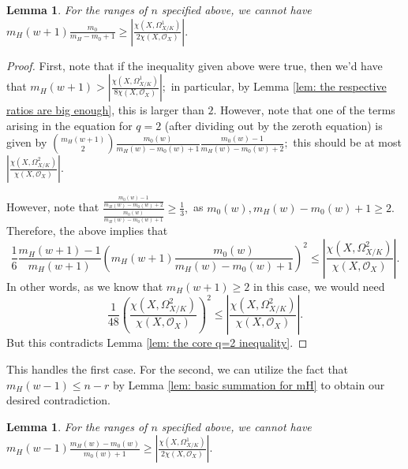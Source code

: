 \documentclass{article}
\newtheorem{lemma}[thm]{Lemma}
\theoremstyle{definition}
\theoremstyle{remark}
\begin{document}
\begin{lemma}
For the ranges of $n$ specified above, we cannot have $m_H(w+1) \frac{m_0}{m_H - m_0 + 1} \geq \left|\frac{\chi(X, \Omega^1_{X/K})}{2\chi(X, \mathcal{O}_X)}\right|.$
\end{lemma}
\begin{proof}
First, note that if the inequality given above were true, then we'd have that $m_H(w+1) > \left|\frac{\chi(X, \Omega^1_{X/K})}{8 \chi(X, \mathcal{O}_X)}\right|;$ in particular, by Lemma \ref{lem: the respective ratios are big enough}, this is larger than $2.$ However, note that one of the terms arising in the equation for $q = 2$ (after dividing out by the zeroth equation) is given by $\binom{m_H(w+1)}{2} \frac{m_0(w)}{m_H(w) - m_0(w) + 1} \frac{m_0(w) - 1}{m_H(w) - m_0(w) + 2};$ this should be at most $\left|\frac{\chi(X, \Omega^2_{X/K})}{\chi(X, \mathcal{O}_X)}\right|.$
\par However, note that $\frac{\frac{m_0(w) - 1}{m_H(w) - m_0(w) + 2}}{\frac{m_0(w)}{m_H(w) - m_0(w) + 1}} \geq \frac{1}{3},$ as $m_0(w), m_H(w) - m_0(w) + 1 \geq 2.$ Therefore, the above implies that $$\frac{1}{6}\frac{m_H(w+1) - 1}{m_H(w+1)} \left(m_H(w+1) \frac{m_0(w)}{m_H(w) - m_0(w) + 1}\right)^2 \leq \left|\frac{\chi(X, \Omega^2_{X/K})}{\chi(X, \mathcal{O}_X)}\right|.$$ In other words, as we know that $m_H(w+1) \geq 2$ in this case, we would need \[\frac{1}{48} \left(\frac{\chi(X, \Omega^2_{X/K})}{\chi(X, \mathcal{O}_X)}\right)^2 \leq \left|\frac{\chi(X, \Omega^2_{X/K})}{\chi(X, \mathcal{O}_X)}\right|.\] But this contradicts Lemma \ref{lem: the core q=2 inequality}.
\end{proof}
This handles the first case. For the second, we can utilize the fact that $m_H(w-1) \leq n-r$ by Lemma \ref{lem: basic summation for mH} to obtain our desired contradiction.
\begin{lemma}\label{lem: mH(w-1) term big}
For the ranges of $n$ specified above, we cannot have $m_H(w-1) \frac{m_H(w) - m_0(w)}{m_0(w) + 1} \geq \left|\frac{\chi(X, \Omega^1_{X/K})}{2\chi(X, \mathcal{O}_X)}\right|.$
\end{lemma}
\end{document}
